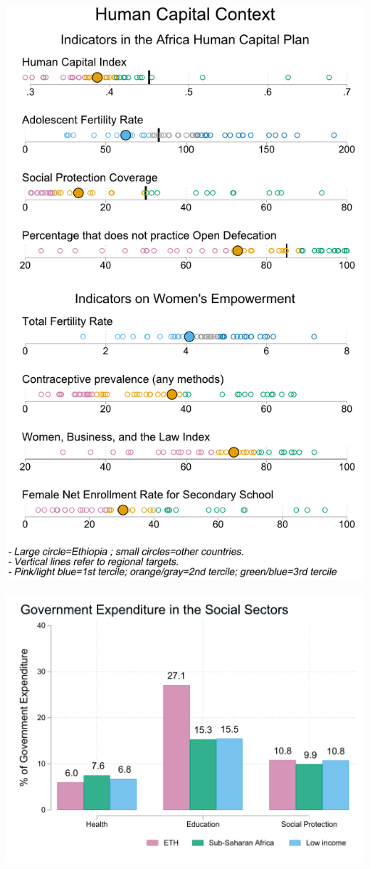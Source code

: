 \documentclass[9.2pt,twocolumn]{article}
\begin{document}
\begin{flushright}\includegraphics[width=1\linewidth]{charts/all_mf_ETH} \end{flushright}

\begin{flushright}\includegraphics[width=1\linewidth,height=1.2\textheight]{charts/socsec_ETH} \end{flushright}
\vspace{3mm}
\end{document}
